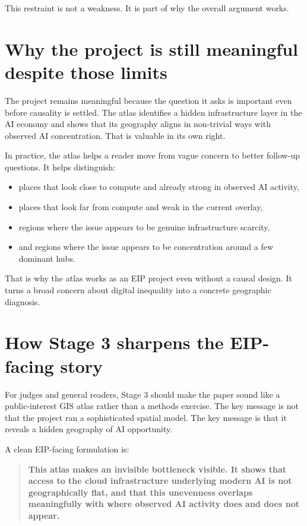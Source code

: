 \documentclass[11pt]{article}
\begin{document}
This restraint is not a weakness. It is part of why the overall argument works.

\section{Why the project is still meaningful despite those limits}
The project remains meaningful because the question it asks is important even before causality is settled. The atlas identifies a hidden infrastructure layer in the AI economy and shows that its geography aligns in non-trivial ways with observed AI concentration. That is valuable in its own right.

In practice, the atlas helps a reader move from vague concern to better follow-up questions. It helps distinguish:
\begin{itemize}[leftmargin=*]
    \item places that look close to compute and already strong in observed AI activity,
    \item places that look far from compute and weak in the current overlay,
    \item regions where the issue appears to be genuine infrastructure scarcity,
    \item and regions where the issue appears to be concentration around a few dominant hubs.
\end{itemize}

That is why the atlas works as an EIP project even without a causal design. It turns a broad concern about digital inequality into a concrete geographic diagnosis.

\section{How Stage 3 sharpens the EIP-facing story}
For judges and general readers, Stage 3 should make the paper sound like a public-interest GIS atlas rather than a methods exercise. The key message is not that the project ran a sophisticated spatial model. The key message is that it reveals a hidden geography of AI opportunity.

A clean EIP-facing formulation is:
\begin{quote}
\textbf{This atlas makes an invisible bottleneck visible. It shows that access to the cloud infrastructure underlying modern AI is not geographically flat, and that this unevenness overlaps meaningfully with where observed AI activity does and does not appear.}
\end{quote}
\end{document}
